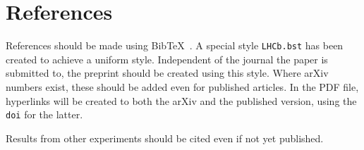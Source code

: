 \section{References}
\label{sec:References}

References should be made using Bib\TeX~\cite{BibTeX}. A special style
\texttt{LHCb.bst} has been created to achieve a uniform
style. Independent of the journal the paper is submitted to, the
preprint should be created using this style. Where arXiv numbers
exist, these should be added even for published articles. In the PDF
file, hyperlinks will be created to both the arXiv and the published
version, using the {\tt doi} for the latter.

Results from other experiments should be cited even if not yet published. 


